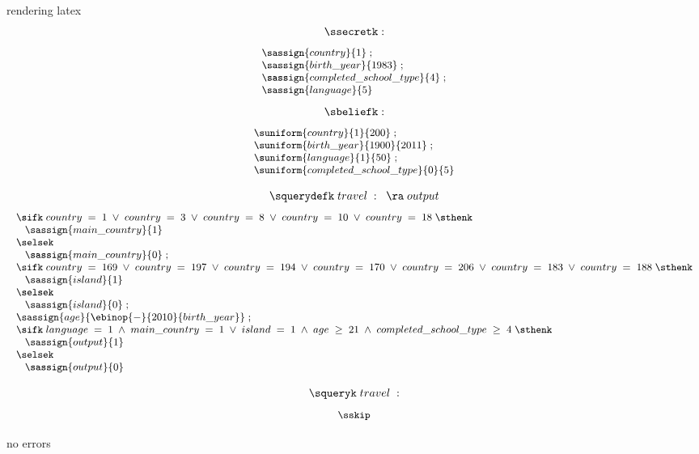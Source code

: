 rendering latex
$$ \ssecretk: $$
\begin{displaymath}{\small
\begin{array}{l}
  \sassign{country}{1}\; ;\\
  \sassign{birth\text{\_}year}{1983}\; ;\\
  \sassign{completed\text{\_}school\text{\_}type}{4}\; ;\\
  \sassign{language}{5}\\
\end{array}
}
\end{displaymath}
$$ \sbeliefk: $$
\begin{displaymath}{\small
\begin{array}{l}
  \suniform{country}{1}{200}\; ;\\
  \suniform{birth\text{\_}year}{1900}{2011}\; ;\\
  \suniform{language}{1}{50}\; ;\\
  \suniform{completed\text{\_}school\text{\_}type}{0}{5}\\
\end{array}
}
\end{displaymath}

$$ \squerydefk \; travel \; : \; \; \ra \; output$$
\begin{displaymath}{\small
\begin{array}{l}
  \sifk \; country \; = \; 1 \; \vee \; country \; = \; 3 \; \vee \; country \; = \; 8 \; \vee \; country \; = \; 10 \; \vee \; country \; = \; 18 \; \sthenk\\
  \;\;\;\sassign{main\text{\_}country}{1}\\
  \selsek\\
  \;\;\;\sassign{main\text{\_}country}{0}\; ;\\
  \sifk \; country \; = \; 169 \; \vee \; country \; = \; 197 \; \vee \; country \; = \; 194 \; \vee \; country \; = \; 170 \; \vee \; country \; = \; 206 \; \vee \; country \; = \; 183 \; \vee \; country \; = \; 188 \; \sthenk\\
  \;\;\;\sassign{island}{1}\\
  \selsek\\
  \;\;\;\sassign{island}{0}\; ;\\
  \sassign{age}{\ebinop{-}{2010}{birth\text{\_}year}}\; ;\\
  \sifk \; language \; = \; 1 \; \wedge \; main\text{\_}country \; = \; 1 \; \vee \; island \; = \; 1 \; \wedge \; age \; \geq \; 21 \; \wedge \; completed\text{\_}school\text{\_}type \; \geq \; 4 \; \sthenk\\
  \;\;\;\sassign{output}{1}\\
  \selsek\\
  \;\;\;\sassign{output}{0}\\
\end{array}
}
\end{displaymath}


$$ \squeryk \; travel \; : $$
\begin{displaymath}{\small
\begin{array}{l}
  \sskip\\
\end{array}
}
\end{displaymath}

no errors
